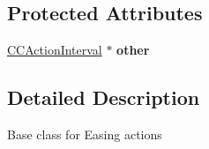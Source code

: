 \subsection*{Protected Attributes}
\begin{DoxyCompactItemize}
\item 
\hypertarget{interface_c_c_action_ease_adc0d571d74ae0be310d6831cf94e6e79}{\hyperlink{class_c_c_action_interval}{C\-C\-Action\-Interval} $\ast$ {\bfseries other}}\label{interface_c_c_action_ease_adc0d571d74ae0be310d6831cf94e6e79}

\end{DoxyCompactItemize}


\subsection{Detailed Description}
Base class for Easing actions 

